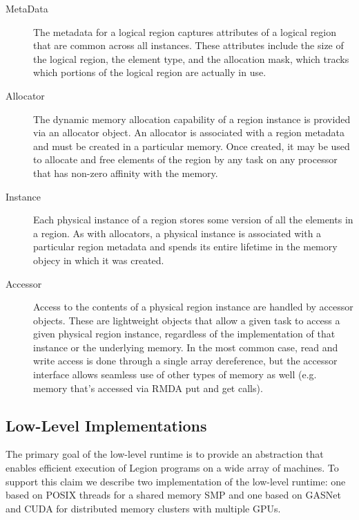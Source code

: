 \begin{description}

\item[MetaData] The metadata for a logical region captures attributes of a
logical region that are common across all instances.  These attributes include
the size of the logical region, the element type, and the allocation mask,
which tracks which portions of the logical region are actually in use.  

\item[Allocator] The dynamic memory allocation capability of a region instance
is provided via an allocator object.  An allocator is associated with a
region metadata and must be created in a particular memory.  Once created, it
may be used to allocate and free elements of the region by any task on any
processor that has non-zero affinity with the memory.

\item[Instance] Each physical instance of a region stores some version of all
the elements in a region.  As with allocators, a physical instance is
associated with a particular region metadata and spends its entire lifetime in
the memory objecy in which it was created.  

\item[Accessor] Access to the contents of a physical region instance are 
handled by accessor objects.  These are lightweight objects that allow a given
task to access a given physical region instance, regardless of the
implementation of that instance or the underlying memory.  In the most common
case, read and write access is done through a single array dereference, but the
accessor interface allows seamless use of other types of memory as well (e.g.
memory that's accessed via RMDA put and get calls).

\end{description}


\subsection{Low-Level Implementations}
\label{subsec:lowimpl}
The primary goal of the low-level runtime is to provide an
abstraction that enables efficient execution of Legion programs
on a wide array of machines.  To support this claim we describe
two implementation of the low-level runtime: one based on POSIX
threads for a shared memory SMP and one based on GASNet and CUDA
for distributed memory clusters with multiple GPUs.

